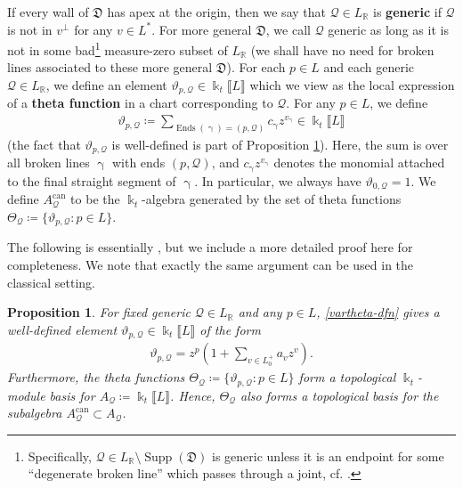 \documentclass{amsart}
\DeclareMathOperator{\Ends}{Ends}
\DeclareMathOperator{\Supp}{Supp}
\DeclareMathOperator{\can}{can}
\let\llb=\llbracket
\let\rrb=\rrbracket
\let\bb=\mathbb
\let\f=\mathfrak
\newcommand {\kk} {\Bbbk}
\newcommand {\kt} {\kk_t}
\newcommand {\sQ} {\mathcal{Q}}
\renewcommand{\gamma}{\upgamma}
\theoremstyle{plain}%
\newtheorem{prop}[thm]{Proposition}
\theoremstyle{definition}
\theoremstyle{remark}
\begin{document}
If every wall of $\f{D}$ has apex at the origin, then we say that $\sQ\in L_{\bb{R}}$ is \textbf{generic} if $\sQ$ is not in $v^{\perp}$ for any $v\in L^*$.  For more general $\f{D}$, we call $\sQ$ generic as long as it is not in some bad\footnote{Specifically, $\sQ\in L_{\bb{R}}\setminus \Supp(\f{D})$ is generic unless it is an endpoint for some ``degenerate broken line'' which passes through a joint, cf. \cite[Rmk. 4.5]{CPS}.} measure-zero subset of $L_{\bb{R}}$ (we shall have no need for broken lines associated to these more general $\f{D}$).  For each $p\in L$ and each generic $\sQ\in L_{\bb{R}}$, we define an element $\vartheta_{p,\sQ}\in \kk_t\llb L\rrb$ which we view as the local expression of a \textbf{theta function} in a chart corresponding to $\sQ$.  For any $p\in L$, we define
\begin{align}\label{vartheta-dfn}
\vartheta_{p,\sQ}\coloneqq \sum_{\Ends(\gamma)=(p,\sQ)} c_{\gamma}z^{v_{\gamma}} \in \kk_t\llb L\rrb
\end{align}
(the fact that $\vartheta_{p,\sQ}$ is well-defined is part of Proposition \ref{TopBasis}).  Here, the sum is over all broken lines $\gamma$ with ends $(p,\sQ)$, and $c_{\gamma}z^{v_{\gamma}}$ denotes the monomial attached to the final straight segment of $\gamma$.   In particular, we always have $\vartheta_{0,\sQ}=1$.  We define $A_{\sQ}^{\can}$ to be the $\kt$-algebra generated by the set of theta functions $\Theta_{\sQ}\coloneqq \{\vartheta_{p,\sQ}\colon p\in L\}$.



The following is essentially \cite[Prop. 2.13]{Man3}, but we include a more detailed proof here for completeness.  We note that exactly the same argument can be used in the classical setting.

\begin{prop}\label{TopBasis}
For fixed generic $\sQ \in L_{\bb{R}}$ and any $p\in L$, \eqref{vartheta-dfn} gives a well-defined element $\vartheta_{p,\sQ} \in \kk_t\llb L\rrb$ of the form \begin{align}\label{pointed}
\vartheta_{p,\sQ}=z^p\left(1+\sum_{v\in L_0^+} a_vz^v\right).
\end{align}
 Furthermore, the theta functions $\Theta_{\sQ}\coloneqq \{\vartheta_{p,\sQ}\colon p\in L\}$ form a topological $\kt$-module basis
 for $A_{\sQ}\coloneqq \kk_t\llb L \rrb$.  Hence, $\Theta_{\sQ}$ also forms a topological basis for the subalgebra $A^{\can}_{\sQ}\subset A_{\sQ}$.
\end{prop}
\end{document}
